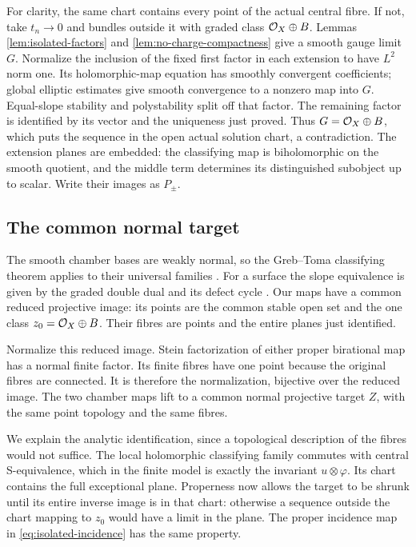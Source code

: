 For clarity, the same chart contains every point of the actual
central fibre. If not, take $t_n\to0$ and bundles outside it
with graded class $\mathcal O_X\oplus B$. Lemmas
\ref{lem:isolated-factors} and \ref{lem:no-charge-compactness}
give a smooth gauge limit $G$. Normalize the inclusion of the
fixed first factor in each extension to have $L^2$ norm one.
Its holomorphic-map equation has smoothly convergent coefficients;
global elliptic estimates give smooth convergence to a nonzero
map into $G$. Equal-slope stability and polystability split off
that factor. The remaining factor is identified by its vector
and the uniqueness just proved. Thus $G=\mathcal O_X\oplus B$, which
puts the sequence in the open actual solution chart, a
contradiction. The extension planes are embedded: the
classifying map is biholomorphic on the smooth quotient, and
the middle term determines its distinguished subobject up to
scalar. Write their images as $P_\pm$.

\subsection{The common normal target}
The smooth chamber bases are weakly normal, so the
Greb--Toma classifying theorem applies to their universal
families \cite[Main Theorem]{grebtoma}. For a surface the
slope equivalence is given by the graded double dual and its
defect cycle \cite[Theorem~5.5, Proposition~5.8 and
Remark~5.9]{grebtoma}. Our maps have a common reduced projective
image: its points are the common stable open set and the one
class $z_0=\mathcal O_X\oplus B$. Their fibres are points and the
entire planes just identified.

Normalize this reduced image. Stein factorization of either
proper birational map has a normal finite factor. Its finite
fibres have one point because the original fibres are connected.
It is therefore the normalization, bijective over the reduced
image. The two chamber maps lift to a common normal projective
target $Z$, with the same point topology and the same fibres.

We explain the analytic identification, since a topological
description of the fibres would not suffice. The local
holomorphic classifying family commutes with central
S-equivalence, which in the finite model is exactly the
invariant $u\otimes\varphi$. Its chart contains the full
exceptional plane. Properness now allows the target to be
shrunk until its entire inverse image is in that chart:
otherwise a sequence outside the chart mapping to $z_0$
would have a limit in the plane. The proper incidence map
in \eqref{eq:isolated-incidence} has the same property.


